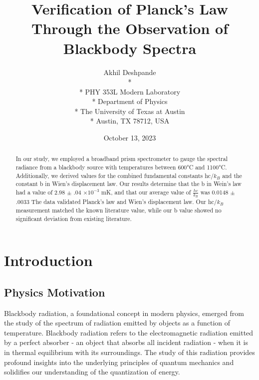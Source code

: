 \documentclass[10pt,letterpaper,onecolumn]{article}
\begin{document}
\title{Verification of Planck's Law Through the Observation of Blackbody Spectra}

\author{
 Akhil Deshpande \\*
  \\*
 PHY 353L Modern Laboratory \\*
 Department of Physics \\*
 The University of Texas at Austin \\*
 Austin, TX 78712, USA
}
\date{October 13, 2023}


\maketitle



\begin{abstract}

In our study, we employed a broadband prism spectrometer to gauge the spectral radiance from a blackbody source with temperatures between 600°C and 1100°C.
Additionally, we derived values for the combined fundamental constants hc/$k_B$ and the constant b in Wien's displacement law. 
Our results determine that the b in Wein's law had a value of 2.98 $\pm$ .04 $\times 10^{-3}$ mK, and
that our average value of $\frac{hc}{k_B}$ was 0.0148 $\pm$ .0033 The data validated Planck's law and Wien's displacement law. Our hc/$k_B$ measurement matched the known literature value, while our b value showed no significant deviation from existing literature.

\end{abstract}


\section{Introduction}

\subsection{Physics Motivation}

Blackbody radiation, a foundational concept in modern physics, emerged 
from the study of the spectrum of radiation emitted by objects as a 
function of temperature. Blackbody radiation refers to the electromagnetic 
radiation emitted by a perfect absorber - an object that absorbs all 
incident radiation - when it is in thermal equilibrium with its surroundings. 
The study of this radiation provides profound insights into the underlying 
principles of quantum mechanics and solidifies our understanding of the 
quantization of energy.
\end{document}
